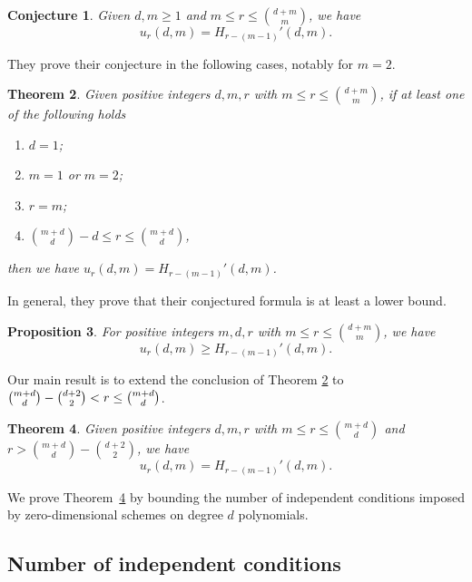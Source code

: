 \documentclass[11pt]{amsart}
\newtheorem{theorem}{Theorem}[section]
\newtheorem{conjecture}[theorem]{Conjecture}
\newtheorem{proposition}[theorem]{Proposition}
\theoremstyle{definition}
\begin{document}
\begin{conjecture}{\cite[Conjecture 1.6]{lin2026largest}}\label{Conjecture urdm}
Given $d,m\geq 1$ and $m\leq r\leq \binom{d+m}{m}$, we have
\[
u_r(d,m)=H_{r-(m-1)}'(d,m).
\]
\end{conjecture}
They prove their conjecture in the following cases, notably for $m=2$.
\begin{theorem}{\cite[Theorem 1.8]{lin2026largest}}\label{thm: cases of urdm}
Given positive integers $d,m,r$ with $m\leq r\leq \binom{d+m}{m}$, if at least one of the following holds
\begin{enumerate}
    \item $d=1$;
    \item $m=1$ or $m=2$;
    \item $r=m$;
    \item $\binom{m+d}{d}-d\leq r\leq \binom{m+d}{d}$,
\end{enumerate}
then we have $u_r(d,m)=H_{r-(m-1)}'(d,m)$.
\end{theorem}
In general, they prove that their conjectured formula is at least a lower bound.
\begin{proposition}{\cite[Proposition 1.7]{lin2026largest}}\label{Prop: lower bound urdm}
For positive integers $m,d,r$ with $m\leq r\leq \binom{d+m}{m}$, we have
\[
u_r(d,m)\geq H_{r-(m-1)}'(d,m).
\]
\end{proposition}

Our main result is to extend the conclusion of Theorem \ref{thm: cases of urdm} to $\binom{m+d}{d}-\tbinom{d+2}{2}< r\leq \tbinom{m+d}{d}$. 

\begin{theorem}\label{Thm: main result}
Given positive integers $d,m,r$ with
$m\leq r\leq \binom{m+d}{d}$ and
$r>\binom{m+d}{d}-\binom{d+2}{2}$, we have
\[
u_r(d,m)=H_{r-(m-1)}'(d,m).
\]
\end{theorem}
We prove Theorem~\ref{Thm: main result} by bounding the number of independent conditions imposed by zero-dimensional schemes on degree $d$ polynomials.

\subsection{Number of independent conditions}
\end{document}
